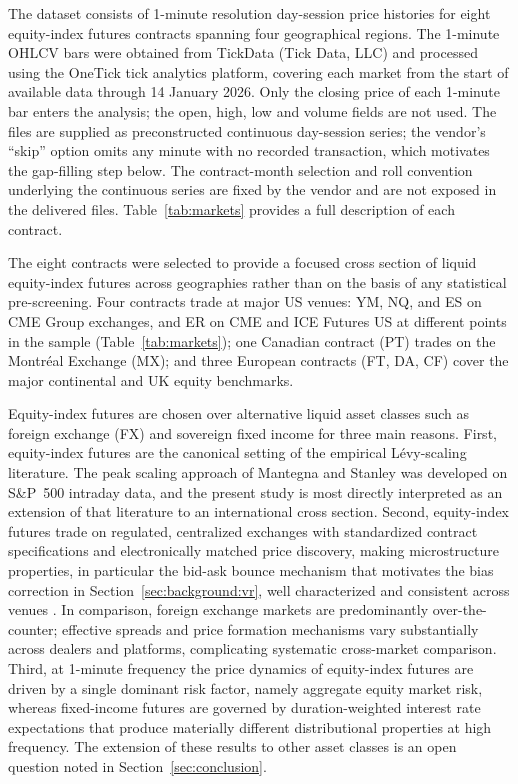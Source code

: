 \documentclass[conference]{IEEEtran}
\begin{document}
The dataset consists of 1-minute resolution day-session price histories for
eight equity-index futures contracts spanning four geographical regions. The
1-minute OHLCV bars were obtained from TickData (Tick Data, LLC) and processed
using the OneTick tick analytics platform, covering each market from the start
of available data through 14 January 2026. Only the closing price of each
1-minute bar enters the analysis; the open, high, low and volume fields are
not used. The files are supplied as
preconstructed continuous day-session series; the vendor's ``skip'' option
omits any minute with no recorded transaction, which motivates the gap-filling
step below. The contract-month selection and roll convention underlying the
continuous series are fixed by the vendor and are not exposed in the
delivered files. Table~\ref{tab:markets} provides a full description of each
contract.


The eight contracts were selected to provide a focused cross section of
liquid equity-index futures across geographies rather than on the basis of
any statistical pre-screening. Four contracts trade at major US venues: YM, NQ, and ES on CME Group exchanges, and ER on CME and ICE Futures US at different points in the sample (Table~\ref{tab:markets}); one Canadian contract (PT) trades on the Montr\'{e}al Exchange (MX); and three European contracts (FT, DA, CF) cover the major continental and UK equity benchmarks.

Equity-index futures are chosen over alternative liquid asset
classes such as foreign exchange (FX) and sovereign fixed income for three main
reasons.
First, equity-index futures are the canonical setting of the empirical
Lévy-scaling literature. The peak scaling approach of Mantegna and Stanley
\cite{MantegnaStanley1994,MantegnaStanley1995} was developed on S\&P~500
intraday data, and the present study is most directly interpreted as an
extension of that literature to an international cross section.
Second, equity-index futures trade on regulated, centralized exchanges with
standardized contract specifications and electronically matched price
discovery, making microstructure properties, in particular the bid-ask
bounce mechanism that motivates the bias correction in
Section~\ref{sec:background:vr}, well characterized and consistent across
venues \cite{Roll1984,Bouchaud2004,ClinetPotiron2021}. In comparison, foreign exchange
markets are predominantly over-the-counter; effective spreads and price
formation mechanisms vary substantially across dealers and platforms,
complicating systematic cross-market comparison.
Third, at 1-minute frequency the price dynamics of equity-index futures are
driven by a single dominant risk factor, namely aggregate equity market
risk, whereas fixed-income futures are governed by duration-weighted interest rate
expectations that produce materially different distributional properties at
high frequency. The extension of these results to other asset classes is an
open question noted in Section~\ref{sec:conclusion}.
\end{document}
